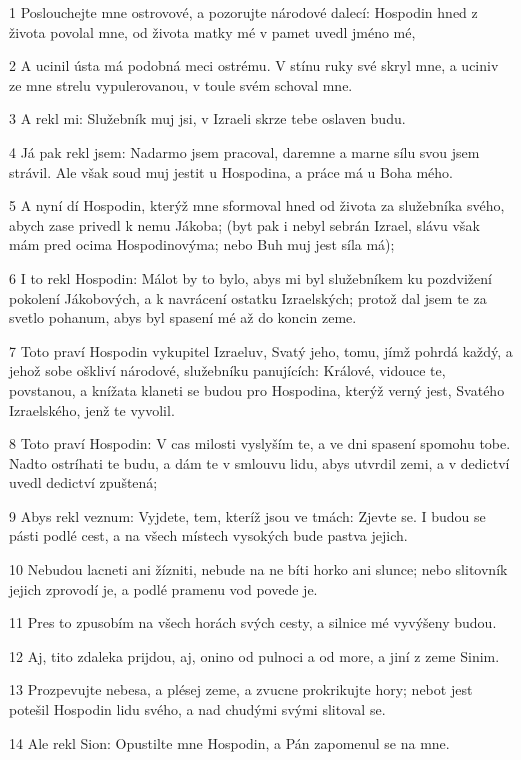 \par 1 Poslouchejte mne ostrovové, a pozorujte národové dalecí: Hospodin hned z života povolal mne, od života matky mé v pamet uvedl jméno mé,
\par 2 A ucinil ústa má podobná meci ostrému. V stínu ruky své skryl mne, a uciniv ze mne strelu vypulerovanou, v toule svém schoval mne.
\par 3 A rekl mi: Služebník muj jsi, v Izraeli skrze tebe oslaven budu.
\par 4 Já pak rekl jsem: Nadarmo jsem pracoval, daremne a marne sílu svou jsem strávil. Ale však soud muj jestit u Hospodina, a práce má u Boha mého.
\par 5 A nyní dí Hospodin, kterýž mne sformoval hned od života za služebníka svého, abych zase privedl k nemu Jákoba; (byt pak i nebyl sebrán Izrael, slávu však mám pred ocima Hospodinovýma; nebo Buh muj jest síla má);
\par 6 I to rekl Hospodin: Málot by to bylo, abys mi byl služebníkem ku pozdvižení pokolení Jákobových, a k navrácení ostatku Izraelských; protož dal jsem te za svetlo pohanum, abys byl spasení mé až do koncin zeme.
\par 7 Toto praví Hospodin vykupitel Izraeluv, Svatý jeho, tomu, jímž pohrdá každý, a jehož sobe oškliví národové, služebníku panujících: Králové, vidouce te, povstanou, a knížata klaneti se budou pro Hospodina, kterýž verný jest, Svatého Izraelského, jenž te vyvolil.
\par 8 Toto praví Hospodin: V cas milosti vyslyším te, a ve dni spasení spomohu tobe. Nadto ostríhati te budu, a dám te v smlouvu lidu, abys utvrdil zemi, a v dedictví uvedl dedictví zpuštená;
\par 9 Abys rekl veznum: Vyjdete, tem, kteríž jsou ve tmách: Zjevte se. I budou se pásti podlé cest, a na všech místech vysokých bude pastva jejich.
\par 10 Nebudou lacneti ani žízniti, nebude na ne bíti horko ani slunce; nebo slitovník jejich zprovodí je, a podlé pramenu vod povede je.
\par 11 Pres to zpusobím na všech horách svých cesty, a silnice mé vyvýšeny budou.
\par 12 Aj, tito zdaleka prijdou, aj, onino od pulnoci a od more, a jiní z zeme Sinim.
\par 13 Prozpevujte nebesa, a plésej zeme, a zvucne prokrikujte hory; nebot jest potešil Hospodin lidu svého, a nad chudými svými slitoval se.
\par 14 Ale rekl Sion: Opustilte mne Hospodin, a Pán zapomenul se na mne.
